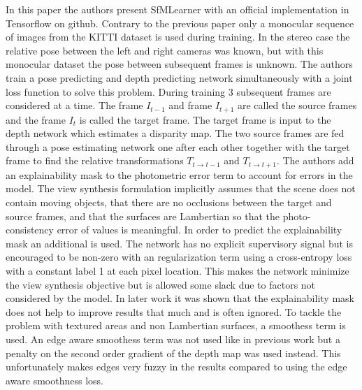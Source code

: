 
In this paper\cite{sfmlearner} the authors present SfMLearner with an official implementation in Tensorflow on github. Contrary to the previous paper\cite{leftright} only a monocular sequence of images from the KITTI dataset is used during training. In the stereo case the relative pose between the left and right cameras was known, but with this monocular dataset the pose between subsequent frames is unknown. The authors train a pose predicting and depth predicting network simultaneously with a joint loss function to solve this problem. During training 3 subsequent frames are considered at a time. The frame $I_{t-1}$ and frame $I_{t+1}$ are called the source frames and the frame $I_t$ is called the target frame. The target frame is input to the depth network which estimates a disparity map. The two source frames are fed through a pose estimating network one after each other together with the target frame to find the relative transformations $T_{t	\rightarrow t-1}$ and $T_{t	\rightarrow t+1}$. The authors add an explainability mask to the photometric error term to account for errors in the model. The view synthesis formulation implicitly assumes that the scene does not contain moving objects, that there are no occlusions between the target and source frames, and that the surfaces are Lambertian so that the photo-consistency error of \abbrRGB values is meaningful. In order to predict the explainability mask an additional \abbrCNN is used. The network has no explicit supervisory signal but is encouraged to be non-zero with an regularization term using a cross-entropy loss with a constant label 1 at each pixel location. This makes the network minimize the view synthesis objective but is allowed some slack due to factors not considered by the model. In later work it was shown that the explainability mask does not help to improve results that much and is often ignored. To tackle the problem with textured areas and non Lambertian surfaces, a smoothess term is used. An edge aware smoothess term was not used like in previous work\cite{leftright} but a penalty on the second order gradient of the depth map was used instead. This unfortunately makes edges very fuzzy in the results compared to using the edge aware smoothness loss.


